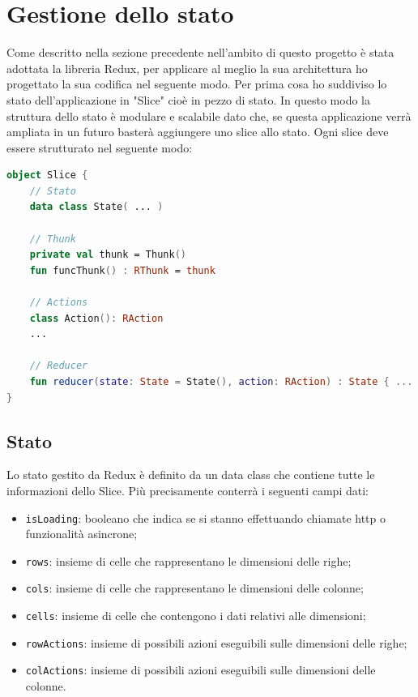 \section{Gestione dello stato}
Come descritto nella sezione precedente nell'ambito di questo progetto è stata adottata la libreria Redux, per applicare al meglio la sua architettura ho progettato la sua codifica nel seguente modo. Per prima cosa ho suddiviso lo stato dell'applicazione in "Slice" cioè in pezzo di stato. In questo modo la struttura dello stato è modulare e scalabile dato che, se questa applicazione verrà ampliata in un futuro basterà aggiungere uno slice allo stato. Ogni slice deve essere strutturato nel seguente modo:
\begin{lstlisting}[caption={Esempio Slice}, label={lst:bodycells}, language=Kotlin]
object Slice {
	// Stato
	data class State( ... )
	
	// Thunk
	private val thunk = Thunk()
	fun funcThunk() : RThunk = thunk
	
	// Actions
	class Action(): RAction
	...
	
	// Reducer
	fun reducer(state: State = State(), action: RAction) : State { ... }
}
\end{lstlisting}

\subsection{Stato}
Lo stato gestito da Redux è definito da un data class che contiene tutte le informazioni dello Slice. Più precisamente conterrà i seguenti campi dati:
\begin{itemize}
	\item \verb|isLoading|: booleano che indica se si stanno effettuando chiamate http o funzionalità asincrone;
	\item \verb|rows|: insieme di celle che rappresentano le dimensioni delle righe;
	\item \verb|cols|: insieme di celle che rappresentano le dimensioni delle colonne;
	\item \verb|cells|: insieme di celle che contengono i dati relativi alle dimensioni;
	\item \verb|rowActions|: insieme di possibili azioni eseguibili sulle dimensioni delle righe;
	\item \verb|colActions|: insieme di possibili azioni eseguibili sulle dimensioni delle colonne.
\end{itemize}

